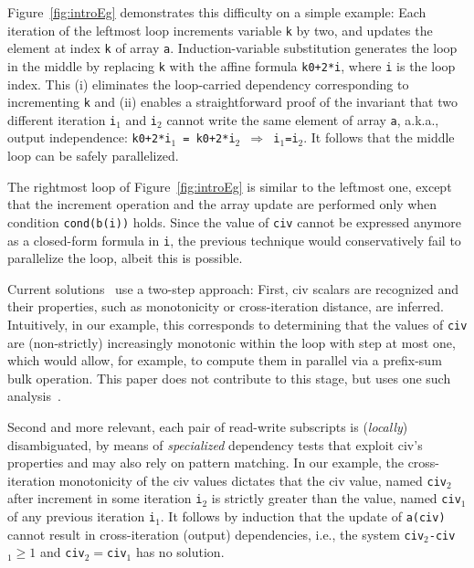 \documentclass{sig-alternate}
\begin{document}
\enlargethispage{\baselineskip}

Figure~\ref{fig:introEg} demonstrates this difficulty on a
simple example:
%
Each iteration of the leftmost loop increments variable {\tt k} by two, and
updates the element at index {\tt k} of array {\tt a}. %
%
Induction-variable substitution generates the loop in the middle by replacing 
{\tt k} with the affine formula {\tt k0+2*i}, where {\tt i} is the 
loop index.   This (i) eliminates the loop-carried dependency corresponding to 
incrementing {\tt k} and (ii) enables a straightforward proof of the invariant
that two different iteration {\tt i$_1$} and {\tt i$_2$} cannot write the same
element of array {\tt a}, a.k.a., output independence: 
{\tt k0+2*i$_1$~=~k0+2*i$_2$ $\Rightarrow$ i$_1$=i$_2$}.
It follows that the middle loop can be safely parallelized.

The rightmost loop of Figure~\ref{fig:introEg} is similar to
the leftmost one, except that the increment operation and the 
array update are performed only when condition {\tt cond(b(i))} 
holds.  Since the value of {\tt civ} cannot be expressed anymore 
as a closed-form formula in {\tt i}, the previous technique would
conservatively fail to parallelize the loop, albeit this is possible.

Current solutions~\cite{Blume94RangeTest,SeqVars,PaduaStackArr,VEG,MonStmt,CohenBeyondMon} 
use a two-step approach:
First, {\sc civ} scalars are recognized and their properties, such as 
monotonicity or cross-iteration distance, are inferred.   
Intuitively, in our example, this corresponds to determining that 
the values of {\tt civ} are (non-strictly) increasingly monotonic
within the loop with step at most one, which would allow, for example, 
to compute them in parallel via a prefix-sum bulk operation. 
This paper does not contribute to this stage, but uses one such analysis~\cite{VEG}.

Second and more relevant, each pair of read-write subscripts is ({\em locally}) 
disambiguated, by means of {\em specialized} dependency tests that exploit
{\sc civ}'s properties and may also rely on pattern matching.
In our example, the cross-iteration monotonicity of the {\sc civ} values 
dictates that the {\sc civ} value, named {\tt civ$_2$} after increment 
in some iteration {\tt i$_2$} is strictly greater than the value,
named {\tt civ$_1$} of any previous iteration {\tt i$_1$}.
It follows by induction that the update of {\tt a(civ)}
cannot result in cross-iteration (output) dependencies, i.e.,
the system {\tt civ$_2$-civ$_1 \geq 1$} and {\tt civ$_2 = $civ$_1$}
has no solution. %
\end{document}
